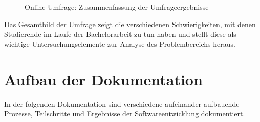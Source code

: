 \documentclass[bibliography=totoc,listof=totoc,BCOR=5mm,DIV=12,oneside]{scrbook}
\begin{document}
\bigskip
\begin{figure}[H]

	
	\vspace{1.5cm}
	
	\vspace{1.5cm}
	
	\caption{Online Umfrage: Zusammenfassung der Umfrageergebnisse}
	\label{img:zusammenfassungOnlineUmfrage}
\end{figure}

\par \bigskip Das Gesamtbild der Umfrage zeigt die verschiedenen Schwierigkeiten, mit denen Studierende im Laufe der Bachelorarbeit zu tun haben und stellt diese als wichtige Untersuchungselemente zur Analyse des Problembereichs heraus.

\newpage
\section{Aufbau der Dokumentation}
\par In der folgenden Dokumentation sind verschiedene aufeinander aufbauende Prozesse, Teilschritte und Ergebnisse der Softwareentwicklung dokumentiert. 
\end{document}
